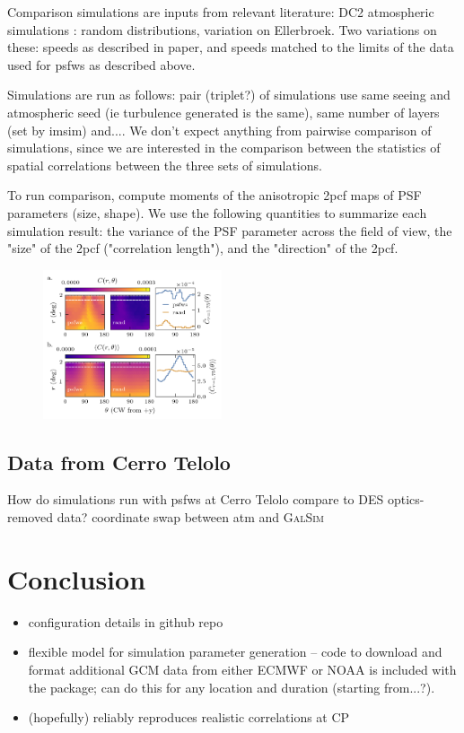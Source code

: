 \documentclass[twocolumn]{aastex631}
\newcommand{\galsim}{\textsc{GalSim}\xspace}
\begin{document}
Comparison simulations are inputs from relevant literature: DC2 atmospheric simulations : random distributions, variation on Ellerbroek.
Two variations on these: speeds as described in paper, and speeds matched to the limits of the data used for psfws as described above.

Simulations are run as follows:
pair (triplet?) of simulations use same seeing and atmospheric seed (ie turbulence generated is the same), same number of layers (set by imsim) and.... 
We don't expect anything from pairwise comparison of simulations, since we are interested in the comparison between the statistics of spatial correlations between the three sets of simulations.

To run comparison, compute moments of the anisotropic 2pcf maps of PSF parameters (size, shape). 
We use the following quantities to summarize each simulation result: the variance of the PSF parameter across the field of view, the "size" of the 2pcf ("correlation length"), and the "direction" of the 2pcf. 

\begin{figure}
\includegraphics[width=0.47\textwidth]{2pcf_to_slice_02.png}
\caption{
    \label{fig:pcfslices}
    }
\end{figure}

\subsection{Data from Cerro Telolo} \label{sec:descompare}
How do simulations run with psfws at Cerro Telolo compare to DES optics-removed data?
coordinate swap between atm and \galsim


\section{Conclusion}
\begin{itemize}
    \item configuration details in github repo
    \item flexible model for simulation parameter generation -- code to download and format additional GCM data from either ECMWF or NOAA is included with the package; can do this for any location and duration (starting from...?). 
    \item (hopefully) reliably reproduces realistic correlations at CP
\end{itemize}
\end{document}
